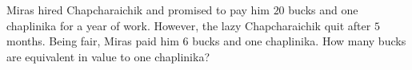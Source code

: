Miras hired Chapcharaichik and promised to pay him $20$ bucks and one chaplinika for a year of work. However, the lazy Chapcharaichik quit after $5$ months. Being fair, Miras paid him $6$ bucks and one chaplinika. How many bucks are equivalent in value to one chaplinika?
